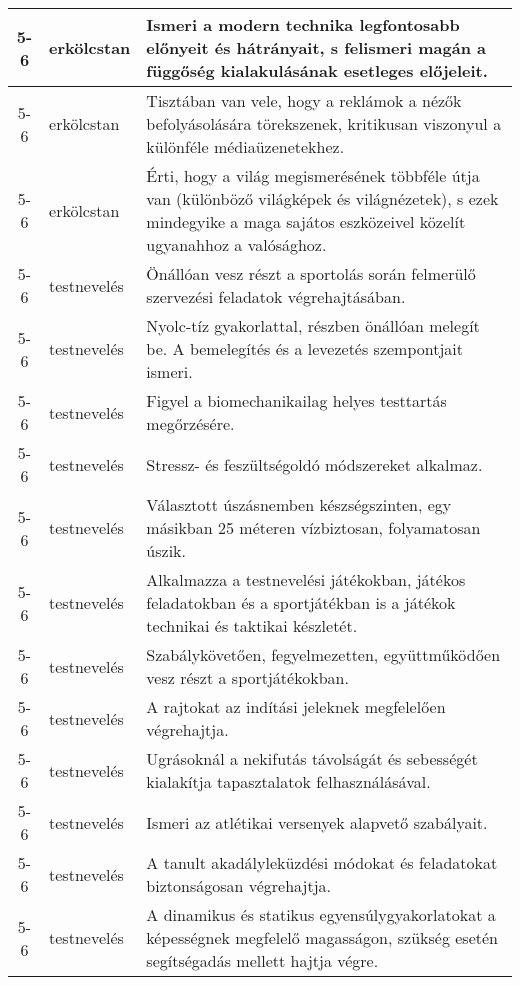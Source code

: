 \begin{small}
\begin{longtable}{c | p{2cm} |  p{11cm} }
              5-6 & erkölcstan & Ismeri a modern technika legfontosabb előnyeit és hátrányait, s felismeri magán a függőség kialakulásának esetleges előjeleit. \\ \hline
              5-6 & erkölcstan & Tisztában van vele, hogy a reklámok a nézők befolyásolására törekszenek, kritikusan viszonyul a különféle médiaüzenetekhez. \\ \hline
              5-6 & erkölcstan & Érti, hogy a világ megismerésének többféle útja van (különböző világképek és világnézetek), s ezek mindegyike a maga sajátos eszközeivel közelít ugyanahhoz a valósághoz. \\ \hline
              5-6 & testnevelés & Önállóan vesz részt a sportolás során felmerülő szervezési feladatok végrehajtásában. \\ \hline
              5-6 & testnevelés & Nyolc-tíz gyakorlattal, részben önállóan melegít be. A bemelegítés és a levezetés szempontjait ismeri. \\ \hline
              5-6 & testnevelés & Figyel a biomechanikailag helyes testtartás megőrzésére. \\ \hline
              5-6 & testnevelés & Stressz- és feszültségoldó módszereket alkalmaz. \\ \hline
              5-6 & testnevelés & Választott úszásnemben készségszinten, egy másikban 25 méteren vízbiztosan, folyamatosan úszik. \\ \hline
              5-6 & testnevelés & Alkalmazza a testnevelési játékokban, játékos feladatokban és a sportjátékban is a játékok technikai és taktikai készletét. \\ \hline
              5-6 & testnevelés & Szabálykövetően, fegyelmezetten, együttműködően vesz részt a sportjátékokban. \\ \hline
              5-6 & testnevelés & A rajtokat az indítási jeleknek megfelelően végrehajtja. \\ \hline
              5-6 & testnevelés & Ugrásoknál a nekifutás távolságát és sebességét kialakítja tapasztalatok felhasználásával. \\ \hline
              5-6 & testnevelés & Ismeri az atlétikai versenyek alapvető szabályait. \\ \hline
              5-6 & testnevelés & A tanult akadályleküzdési módokat és feladatokat biztonságosan végrehajtja. \\ \hline
              5-6 & testnevelés & A dinamikus és statikus egyensúlygyakorlatokat a képességnek megfelelő magasságon, szükség esetén segítségadás mellett hajtja végre. \\ \hline

\end{longtable}
\end{small}
